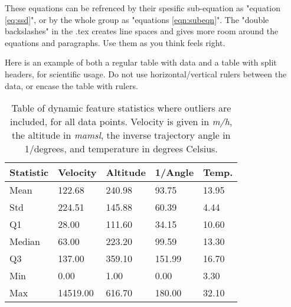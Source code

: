 \noindent These equations can be refrenced by their spesific sub-equation as "equation \eqref{eq:ssd}", or by the whole group as "equations \eqref{eqn:subeqn}". The "double backslashes" in the .tex creates line spaces and gives more room around the equations and paragraphs. Use them as you think feels right. 



Here is an example of both a regular table with data and a table with split headers, for scientific usage. Do not use horizontal/vertical rulers between the data, or encase the table with rulers. \\

\begin{table}[ht!]
\centering
    \begin{tabular}{ m{3cm} m{2.5cm} m{2.5cm} m{2.5cm} m{2cm} } 
    \toprule
    \toprule
    \textbf{Statistic} & \textbf{Velocity} & \textbf{Altitude} & \textbf{1/Angle} & \textbf{Temp.} \\
    \midrule
    Mean    & 122.68    & 240.98   & 93.75     & 13.95 \\[1.3ex]
    Std     & 224.51    & 145.88   & 60.39     & 4.44  \\[1.3ex]
    Q1      & 28.00     & 111.60   & 34.15     & 10.60 \\[1.3ex]
    Median  & 63.00     & 223.20   & 99.59     & 13.30 \\[1.3ex]
    Q3      & 137.00    & 359.10   & 151.99    & 16.70 \\[1.3ex]
    Min     & 0.00      & 1.00     & 0.00      & 3.30  \\[1.3ex]
    Max     & 14519.00  & 616.70   & 180.00    & 32.10 \\[1.3ex]
    \bottomrule
    \bottomrule
    \end{tabular}
\caption[Dynamic feature statistics with outliers]{Table of dynamic feature statistics where outliers are included, for all data points. Velocity is given in \textit{m/h}, the altitude in \textit{mamsl}, the inverse trajectory angle in 1/degrees, and temperature in degrees Celsius.}
\label{table:stat_fliers}
\end{table}


